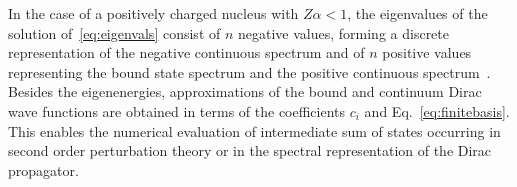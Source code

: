 In the case of a positively charged nucleus with $Z\alpha<1$, the eigenvalues of the solution of~\eqref{eq:eigenvals} consist of $n$ negative values, forming a discrete representation of the negative continuous spectrum and of $n$ positive values representing the bound state spectrum and the positive continuous spectrum~\cite{drake1981}. Besides the eigenenergies, approximations of the bound and continuum Dirac wave functions are obtained in terms of the coefficients $c_i$ and Eq.~\eqref{eq:finitebasis}. This enables the numerical evaluation of intermediate sum of states occurring in second order perturbation theory or in the spectral representation of the Dirac propagator.





